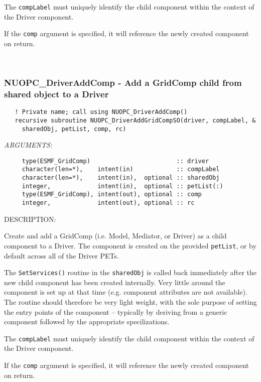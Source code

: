    The {\tt compLabel} must uniquely identify the child component within the
   context of the Driver component.
  
   If the {\tt comp} argument is specified, it will reference the newly created
   component on return. 
 
\mbox{}\hrulefill\ 
 
\subsubsection [NUOPC\_DriverAddComp] {NUOPC\_DriverAddComp - Add a GridComp child from shared object to a Driver}


  
\begin{verbatim}   ! Private name; call using NUOPC_DriverAddComp()
   recursive subroutine NUOPC_DriverAddGridCompSO(driver, compLabel, &
     sharedObj, petList, comp, rc)\end{verbatim}{\em ARGUMENTS:}
\begin{verbatim}     type(ESMF_GridComp)                        :: driver
     character(len=*),    intent(in)            :: compLabel
     character(len=*),    intent(in),  optional :: sharedObj
     integer,             intent(in),  optional :: petList(:)
     type(ESMF_GridComp), intent(out), optional :: comp
     integer,             intent(out), optional :: rc\end{verbatim}
{\sf DESCRIPTION:\\ }


   Create and add a GridComp (i.e. Model, Mediator, or Driver) as a child 
   component to a Driver. The component is created on the provided {\tt petList},
   or by default across all of the Driver PETs. 
  
   The {\tt SetServices()} routine in the {\tt sharedObj} is called back
   immediately after the
   new child component has been created internally. Very little around the
   component is set up at that time (e.g. component attributes are not 
   available). The routine should therefore be very light weight, with the sole
   purpose of setting the entry points of the component -- typically by deriving 
   from a generic component followed by the appropriate specilizations.
  
   The {\tt compLabel} must uniquely identify the child component within the
   context of the Driver component.
  
   If the {\tt comp} argument is specified, it will reference the newly created
   component on return. 
 
